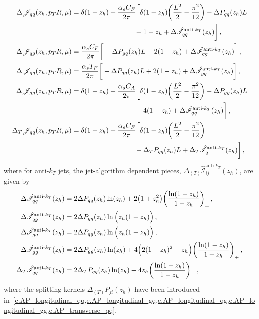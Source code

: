 \documentclass[a4paper, 11 pt]{article}
\begin{document}
\begin{align}
\Delta \mathscr{J}_{qq} (z_h, p_TR, \mu)
& =
\delta (1-z_h) + \frac{\alpha _s C_F}{2 \pi} \bigg[\delta(1-z_h) \pqty{\frac{L^2}{2} - \frac{\pi^2}{12}} - \Delta P_{qq}(z_h) L
\nonumber \\
& \qquad \qquad \qquad \qquad \quad +
1 - z_h + \Delta \hat{\mathscr{I}}_{qq}^{\text{anti-}k_T}(z_h) \bigg]
\, , \\
\Delta \mathscr{J}_{q g} (z_h, p_TR, \mu)
& =
\frac{\alpha _s C_F}{2 \pi} \bigg[-\Delta P_{gq}(z_h) L - 2 (1-z_h) + \Delta \hat{\mathscr{I}}_{qg}^{\text{anti-}k_T}(z_h) \bigg]
\, , \\
\Delta \mathscr{J}_{g q} (z_h, p_TR, \mu)
& =
\frac{\alpha _s T_F}{2 \pi} \bigg[-\Delta P_{qg}(z_h) L + 2 (1-z_h) + \Delta \hat{\mathscr{I}}_{gq}^{\text{anti-}k_T}(z_h) \bigg]
\, , \\
\Delta \mathscr{J}_{gg} (z_h, p_TR, \mu)
& =
\delta (1-z_h) + \frac{\alpha _s C_A}{2 \pi} \bigg[\delta (1-z_h) \pqty{\frac{L^2}{2} - \frac{\pi ^2}{12}} - \Delta P_{gg}(z_h) L
\nonumber \\
& \qquad \qquad \qquad \qquad \quad - 4 (1-z_h) + \Delta \hat{\mathscr{I}}_{gg}^{\text{anti-}k_T}(z_h) \bigg]
\, , \\
\Delta _T \mathscr{J}_{qq} (z_h, p_TR, \mu)
& =
\delta (1-z_h) + \frac{\alpha _s C_F}{2 \pi} \bigg[\delta (1-z_h) \pqty{\frac{L^2}{2} - \frac{\pi ^2}{12}}
\nonumber \\
& \qquad \qquad \qquad \qquad \quad -
\Delta _T P_{qq}(z_h) L + \Delta _T \hat{\mathscr{I}}_q^{\text{anti-}k_T}(z_h) \bigg]
\, ,
\end{align}
where for anti-$k_T$ jets, the jet-algorithm dependent pieces, $\Delta_{(T)}\hat{\mathscr{I}}_{i j}^{\text{anti-}k_T}(z_h)$, are given by
\begin{align}
\Delta \hat{\mathscr{I}}_{qq}^{\text{anti-}k_T} \pqty{z_h}
& =
2 \Delta P_{qq}(z_h) \ln(z_h) + 2 \pqty{1+z_h^2} \pqty{\frac{\ln (1-z_h)}{1-z_h}}_+
\, , \\
\Delta \hat{\mathscr{I}}_{qg}^{\text{anti-}k_T} \pqty{z_h}
& =
2 \Delta P_{gq}(z_h) \ln{\Big(z_h (1-z_h)\Big)}
\, , \\
\Delta \hat{\mathscr{I}}_{gq}^{\text{anti-}k_T} \pqty{z_h}
& =
2 \Delta P_{qg}(z_h) \ln{\Big(z_h (1-z_h)\Big)}
\, , \\
\Delta \hat{\mathscr{I}}_{gg}^{\text{anti-}k_T} \pqty{z_h}
& =
2 \Delta P_{gg}(z_h) \ln(z_h) + 4 \Big(2 (1-z_h)^2 + z_h \Big) \pqty{\frac{\ln(1-z_h)}{1-z_h}}_+
\, , \\
\Delta _T \hat{\mathscr{I}}_{qq}^{\text{anti-}k_T} \pqty{z_h}
& =
2 \Delta _T P_{qq}(z_h) \ln(z_h) + 4 z_h \pqty{\frac{\ln(1-z_h)}{1-z_h}}_+
\, ,
\end{align}
where the splitting kernels $\Delta_{(T)}{P}_{ji}(z_h)$ \cite{Vogelsang:1996im,Vogelsang:1997ak} have been introduced in~\cref{e.AP_longitudinal_qq,e.AP_longitudinal_gq,e.AP_longitudinal_qg,e.AP_longitudinal_gg,e.AP_transverse_qq}. 
\end{document}
